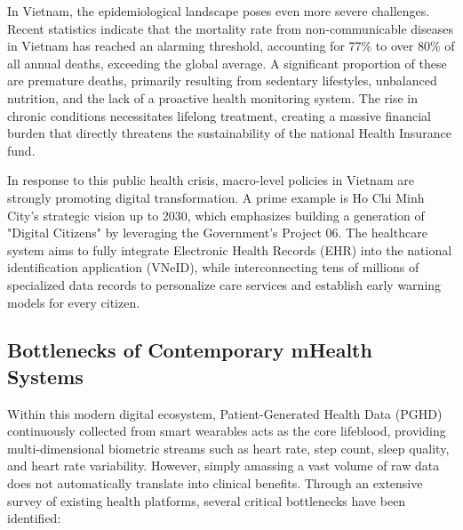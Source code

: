 \documentclass[journal, a4paper]{IEEEtran}
\begin{document}
In Vietnam, the epidemiological landscape poses even more severe challenges. Recent statistics indicate that the mortality rate from non-communicable diseases in Vietnam has reached an alarming threshold, accounting for 77\% to over 80\% of all annual deaths, exceeding the global average. A significant proportion of these are premature deaths, primarily resulting from sedentary lifestyles, unbalanced nutrition, and the lack of a proactive health monitoring system. The rise in chronic conditions necessitates lifelong treatment, creating a massive financial burden that directly threatens the sustainability of the national Health Insurance fund.

In response to this public health crisis, macro-level policies in Vietnam are strongly promoting digital transformation. A prime example is Ho Chi Minh City's strategic vision up to 2030, which emphasizes building a generation of "Digital Citizens" by leveraging the Government's Project 06. The healthcare system aims to fully integrate Electronic Health Records (EHR) into the national identification application (VNeID), while interconnecting tens of millions of specialized data records to personalize care services and establish early warning models for every citizen.

\subsection{Bottlenecks of Contemporary mHealth Systems}
Within this modern digital ecosystem, Patient-Generated Health Data (PGHD) continuously collected from smart wearables acts as the core lifeblood, providing multi-dimensional biometric streams such as heart rate, step count, sleep quality, and heart rate variability. However, simply amassing a vast volume of raw data does not automatically translate into clinical benefits. Through an extensive survey of existing health platforms, several critical bottlenecks have been identified:
\end{document}
